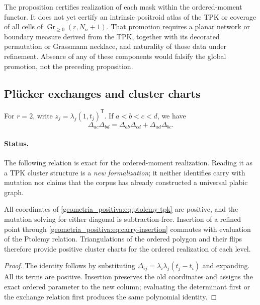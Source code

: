 The proposition certifies realization of each mask within the ordered-moment functor. It does not yet certify an intrinsic positroid atlas of the TPK or coverage of all cells of \(\operatorname{Gr}_{\ge0}(r,N_n+1)\). That promotion requires a planar network or boundary measure derived from the TPK, together with its decorated permutation or Grassmann necklace, and naturality of those data under refinement. Absence of any of these components would falsify the global promotion, not the preceding proposition.

\subsection{Plücker exchanges and cluster charts}

For \(r=2\), write \(z_j=\lambda_j(1,t_j)^{\mathsf T}\). If \(a<b<c<d\), we have
\begin{equation}
 \Delta_{ac}\Delta_{bd}
 =\Delta_{ab}\Delta_{cd}+\Delta_{ad}\Delta_{bc}.
 \label{geometria_positiva:eq:ptolemy-tpk}
\end{equation}

\paragraph{Status.}
The following relation is exact for the ordered-moment realization. Reading it as a TPK cluster structure is a \emph{new formalization}; it neither identifies carry with mutation nor claims that the corpus has already constructed a universal plabic graph.

\begin{proposition}
\label{geometria_positiva:thm:tpk-cluster-rank2} All coordinates of \eqref{geometria_positiva:eq:ptolemy-tpk} are positive, and the mutation solving for either diagonal is subtraction-free. Insertion of a refined point through \eqref{geometria_positiva:eq:carry-insertion} commutes with evaluation of the Ptolemy relation. Triangulations of the ordered polygon and their flips therefore provide positive cluster charts for the ordered realization of each level.
\end{proposition}
\begin{proof}
The identity follows by substituting \(\Delta_{ij}=\lambda_i\lambda_j(t_j-t_i)\) and expanding. All its terms are positive. Insertion preserves the old coordinates and assigns the exact ordered parameter to the new column; evaluating the determinant first or the exchange relation first produces the same polynomial identity.
\end{proof}

